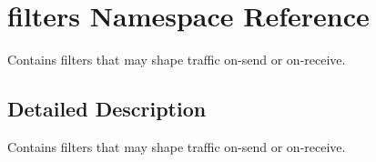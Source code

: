 \hypertarget{namespacefilters}{}\section{filters Namespace Reference}
\label{namespacefilters}


Contains filters that may shape traffic on-\/send or on-\/receive.  




\subsection{Detailed Description}
Contains filters that may shape traffic on-\/send or on-\/receive. 